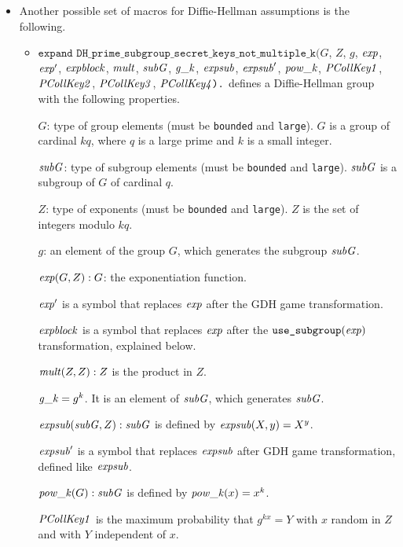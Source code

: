\documentclass{article}
\begin{document}
\begin{itemize}
\begin{itemize}
   \end{itemize}

\iffalse
 \item Another possible set of macros for Diffie-Hellman assumptions is the following.
   \begin{itemize}
   \item $\texttt{expand\ DH\_prime\_subgroup\_secret\_keys\_not\_multiple\_k(}G$, $Z$, $g$, $\mathit{exp}$, $\mathit{exp}'$, $\mathit{expblock}$, $\mathit{mult}$, $\mathit{subG}$, $\mathit{g\_k}$, $\mathit{expsub}$, $\mathit{expsub}'$, $\mathit{pow\_k}$, $\mathit{PCollKey1}$, $\mathit{PCollKey2}$, $\mathit{PCollKey3}$, $\mathit{PCollKey4}\texttt{).}$ defines a Diffie-Hellman group with the following properties.

       $G$: type of group elements (must be \texttt{bounded} and \texttt{large}).   
       $G$ is a group of cardinal $kq$, where $q$ is a large prime and $k$ is a small integer.

       $\mathit{subG}$: type of subgroup elements (must be \texttt{bounded} and \texttt{large}). 
       $\mathit{subG}$ is a subgroup of $G$ of cardinal $q$.

       $Z$: type of exponents (must be \texttt{bounded} and \texttt{large}). 
       $Z$ is the set of integers modulo $kq$.
       
       $g$: an element of the group $G$, which generates the subgroup $\mathit{subG}$.

       $\mathit{exp}(G, Z): G$: the exponentiation function.  

       $\mathit{exp}'$ is a symbol that replaces $\mathit{exp}$ after the GDH game transformation.

       $\mathit{expblock}$ is a symbol that replaces $\mathit{exp}$ after the $\texttt{use\_subgroup}(\mathit{exp})$ transformation, explained below.

       $\mathit{mult}(Z,Z): Z$ is the product in $Z$.

       $\mathit{g\_k} = g^k$. It is an element of $\mathit{subG}$, which generates $\mathit{subG}$.

       $\mathit{expsub}(\mathit{subG},Z): \mathit{subG}$ is defined by $\mathit{expsub}(X,y) = X^y$.
       
       $\mathit{expsub}'$ is a symbol that replaces $\mathit{expsub}$ after GDH game transformation,
       defined like $\mathit{expsub}$.

       $\mathit{pow\_k}(G):\mathit{subG}$ is defined by $\mathit{pow\_k}(x) = x^k$.
   
       $\mathit{PCollKey1}$ is the maximum probability that $g^{kx} = Y$ with $x$ random in $Z$ and with $Y$ independent of $x$.


\end{itemize}
\end{itemize}
\end{document}
